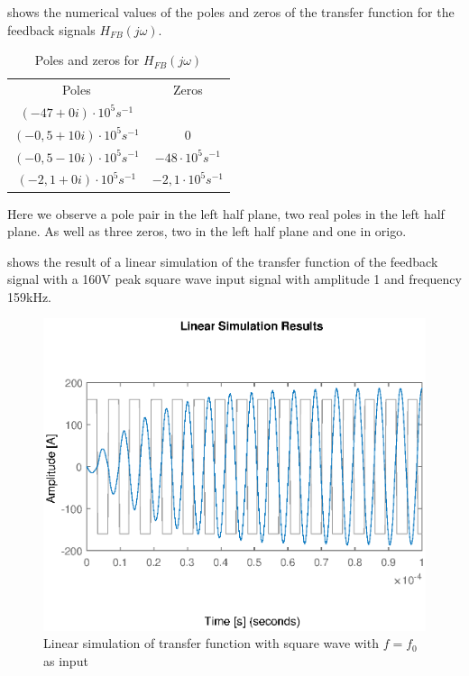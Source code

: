  shows the numerical values of the poles and zeros of the transfer function for the feedback signals $H_{FB}(j\omega)$.

\begin{table}[h]
    \centering
    \begin{tabular}{c|c}
        Poles & Zeros \\
        $(-47 + 0i)\cdot 10^{5} s^{-1}$ & \\
        $(-0,5 + 10i)\cdot 10^{5} s^{-1}$ & $0$ \\
        $(-0,5 - 10i)\cdot 10^{5} s^{-1}$ & $-48\cdot 10^{5} s^{-1}$ \\
        $(-2,1 + 0i)\cdot 10^{5} s^{-1}$ & $-2,1\cdot 10^{5} s^{-1}$ \\
    \end{tabular}
    \caption{Poles and zeros for $H_{FB}(j\omega)$}
    \label{tab:fbcoilrigpoles}
\end{table}

Here we observe a pole pair in the left half plane, two real poles in the left half plane. As well as three zeros, two in the left half plane and one in origo.

 shows the result of a linear simulation of the transfer function of the feedback signal with a 160V peak square wave input signal with amplitude 1 and frequency 159kHz.

\begin{figure}[H]
    \centering
    \includegraphics[width=\textwidth]{img/FeedBackSimulation.eps}
    \caption{Linear simulation of transfer function with square wave with $f=f_0$ as input}
    \label{fig:fblinsim}
\end{figure}

